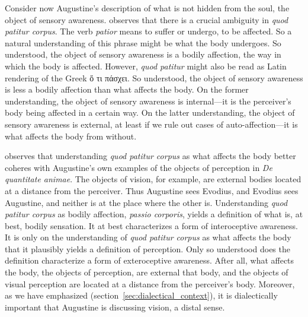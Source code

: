 \documentclass[12pt]{article}
\begin{document}
Consider now Augustine's description of what is not hidden from the soul, the object of sensory awareness. \citet[274--278]{Brittain:2002hl} observes that there is a crucial ambiguity in \emph{quod patitur corpus}. The verb \emph{patior} means to suffer or undergo, to be affected. So a natural understanding of this phrase might be what the body undergoes. So understood, the object of sensory awareness is a bodily affection, the way in which the body is affected. However, \emph{quod patitur} might also be read as Latin rendering of the Greek {\sbl ὅ τι πάσχει}. So understood, the object of sensory awareness is less a bodily affection than what affects the body. On the former understanding, the object of sensory awareness is internal---it is the perceiver's body being affected in a certain way. On the latter understanding, the object of sensory awareness is external, at least if we rule out cases of auto-affection---it is what affects the body from without. 

\citet[]{Brittain:2002hl} observes that understanding \emph{quod patitur corpus} as what affects the body better coheres with Augustine's own examples of the objects of perception in \emph{De quantitate animae}. The objects of vision, for example, are external bodies located at a distance from the perceiver. Thus Augustine sees Evodius, and Evodius sees Augustine, and neither is at the place where the other is.
Understanding \emph{quod patitur corpus} as bodily affection, \emph{passio corporis}, yields a definition of what is, at best, bodily sensation. It at best characterizes a form of interoceptive awareness. It is only on the understanding of \emph{quod patitur corpus} as what affects the body that it plausibly yields a definition of perception. Only so understood does the definition characterize a form of exteroceptive awareness. After all, what affects the body, the objects of perception, are external that body, and the objects of visual perception are located at a distance from the perceiver's body.  Moreover, as we have emphasized (section~\ref{sec:dialectical_context}), it is dialectically important that Augustine is discussing vision, a distal sense.

\end{document}
